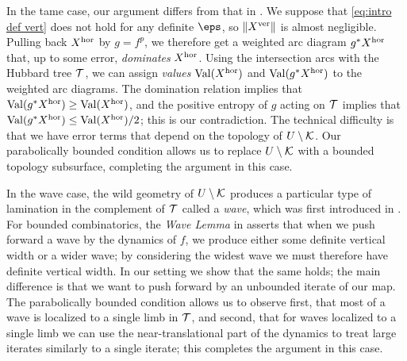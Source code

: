 \documentclass[12pt]{amsart}
\begin{document}
In the tame case, our argument differs from that in  \cite{K06}. 
We suppose that \eqref{eq:intro def vert} does not hold for any definite $\eps$, so $\|X^{\mathrm{ver}}\|$ is almost negligible.
Pulling back $X^{\mathrm{hor}}$ by $g= f^p$, we therefore get a weighted arc diagram $g^*X^{\mathrm{hor}}$ that, up to some error, \textit{dominates} $X^{\mathrm{hor}}$.
Using the intersection arcs with the Hubbard tree $\mathcal T$, we can assign \textit{values} $\operatorname{Val}(X^{\mathrm{hor}})$ and $\operatorname{Val}(g^*X^{\mathrm{hor}})$ to the weighted arc diagrams. The domination relation implies that 
{ $\operatorname{Val}(g^*X^{\mathrm{hor}})\geq \operatorname{Val}(X^{\mathrm{hor}})$,} and the positive entropy of $g$ acting on $\mathcal T$ implies that $\operatorname{Val}(g^*X^{\mathrm{hor}})\leq \operatorname{Val}(X^{\mathrm{hor}})/2$; this is our contradiction. The technical difficulty is that we have error terms that depend on the topology of $U\setminus \mathcal K$. Our parabolically bounded condition allows us to replace $U\setminus \mathcal K$ with a bounded topology subsurface, completing the argument in this case.

In the wave case, the wild geometry of $U\setminus \mathcal K$ produces a particular type of lamination in the complement of $\mathcal T$ called a \textit{wave}, which was first introduced in \cite{dudko2023mlcfeigenbaumpoints}. 
For bounded combinatorics, 
the \emph{Wave Lemma} in \cite{dudko2023mlcfeigenbaumpoints} asserts that when we push forward a wave by the dynamics of $f$, we produce either some definite vertical width or a wider wave; by considering the widest wave we must therefore have definite vertical width. 
In our setting we show that the same holds; the main difference is that we want to push forward by an unbounded iterate of our map. 
The parabolically bounded condition allows us to observe first, that most of a wave is localized to a single limb in $\mathcal T$, and second, that for waves localized to a single limb we can use the near-translational part of the dynamics to treat large iterates similarly to a single iterate; this completes the argument in this case.
\end{document}

